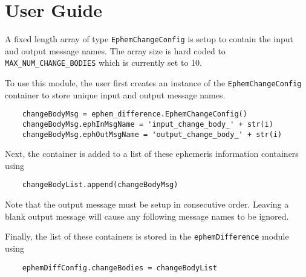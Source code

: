 
\section{User Guide}

A fixed length array of type {\tt EphemChangeConfig} is setup to contain the input and output message names.  The array size is hard coded to {\tt MAX\_NUM\_CHANGE\_BODIES} which is currently set to 10.  

To use this module, the user first creates an instance of the {\tt EphemChangeConfig} container to store unique input and output message names.
\begin{verbatim}
	changeBodyMsg = ephem_difference.EphemChangeConfig()
	changeBodyMsg.ephInMsgName = 'input_change_body_' + str(i)
	changeBodyMsg.ephOutMsgName = 'output_change_body_' + str(i)
\end{verbatim}
Next, the container is added to a list of these ephemeris information containers using 
\begin{verbatim}
	changeBodyList.append(changeBodyMsg)
\end{verbatim}
Note that the output message must be setup in consecutive order.  Leaving a blank output message will cause any following message names to be ignored. 

Finally, the list of these containers is stored in the {\tt ephemDifference} module using
\begin{verbatim}
	ephemDiffConfig.changeBodies = changeBodyList
\end{verbatim}

